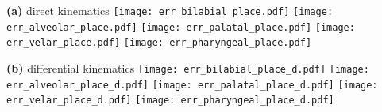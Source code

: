 \documentclass[varwidth=7in]{standalone}
\begin{document}
\raggedright

{\bf (a)} direct kinematics
\texttt{[image: err\_bilabial\_place.pdf]}%
\texttt{[image: err\_alveolar\_place.pdf]}%
\texttt{[image: err\_palatal\_place.pdf]}%
\texttt{[image: err\_velar\_place.pdf]}%
\texttt{[image: err\_pharyngeal\_place.pdf]}

{\bf (b)} differential kinematics
\texttt{[image: err\_bilabial\_place\_d.pdf]}%
\texttt{[image: err\_alveolar\_place\_d.pdf]}%
\texttt{[image: err\_palatal\_place\_d.pdf]}%
\texttt{[image: err\_velar\_place\_d.pdf]}%
\texttt{[image: err\_pharyngeal\_place\_d.pdf]}
\end{document}
